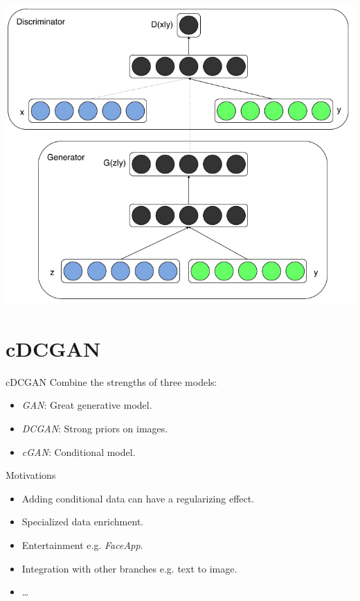 \documentclass{beamer}
\begin{document}
\begin{frame}
    \centering
    \includegraphics[scale=0.35]{images/cgan-scheme.png}
\end{frame}

\section{cDCGAN}
\begin{frame}{cDCGAN}
    Combine the strengths of three models:
    \begin{itemize}
        \item \textit{GAN}: Great generative model.
        \item \textit{DCGAN}: Strong priors on images.
        \item \textit{cGAN}: Conditional model.
    \end{itemize}
\end{frame}

\begin{frame}{Motivations}
    \begin{itemize}
        \item Adding conditional data can have a regularizing effect.
        \item Specialized data enrichment.
        \item Entertainment e.g. \textit{FaceApp}.
        \item Integration with other branches e.g. text to image.
        \item \dots
    \end{itemize}
\end{frame}
\end{document}
